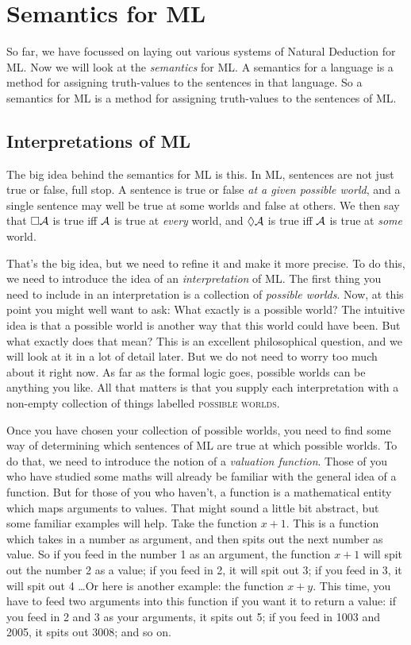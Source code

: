 \chapter{Semantics for ML}
\label{Semantics}

So far, we have focussed on laying out various systems of Natural Deduction for ML. Now we will look at the \emph{semantics} for ML. A semantics for a language is a method for assigning truth-values to the sentences in that language. So a semantics for ML is a method for assigning truth-values to the sentences of ML.

\section{Interpretations of ML}

The big idea behind the semantics for ML is this. In ML, sentences are not just true or false, full stop. A sentence is true or false \emph{at a given possible world}, and a single sentence may well be true at some worlds and false at others. We then say that $\Box \mathcal{A}$ is true iff $\mathcal{A}$ is true at \emph{every} world, and $\Diamond\mathcal{A}$ is true iff $\mathcal{A}$ is true at \emph{some} world.

That's the big idea, but we need to refine it and make it more precise. To do this, we need to introduce the idea of an \emph{interpretation} of ML. The first thing you need to include in an interpretation is a collection of \emph{possible worlds}. Now, at this point you might well want to ask: What exactly is a possible world? The intuitive idea is that a possible world is another way that this world could have been. But what exactly does that mean? This is an excellent philosophical question, and we will look at it in a lot of detail later. But we do not need to worry too much about it right now. As far as the formal logic goes, possible worlds can be anything you like. All that matters is that you supply each interpretation with a non-empty collection of things labelled \textsc{possible worlds}.

Once you have chosen your collection of possible worlds, you need to find some way of determining which sentences of ML are true at which possible worlds. To do that, we need to introduce the notion of a \emph{valuation function}. Those of you who have studied some maths will already be familiar with the general idea of a function. But for those of you who haven't, a function is a mathematical entity which maps arguments to values. That might sound a little bit abstract, but some familiar examples will help. Take the function $x+1$. This is a function which takes in a number as argument, and then spits out the next number as value. So if you feed in the number 1 as an argument, the function $x+1$ will spit out the number 2 as a value; if you feed in 2, it will spit out 3; if you feed in 3, it will spit out 4 \dots  Or here is another example: the function $x+y$. This time, you have to feed two arguments into this function if you want it to return a value: if you feed in 2 and 3 as your arguments, it spits out 5; if you feed in 1003 and 2005, it spits out 3008; and so on.

